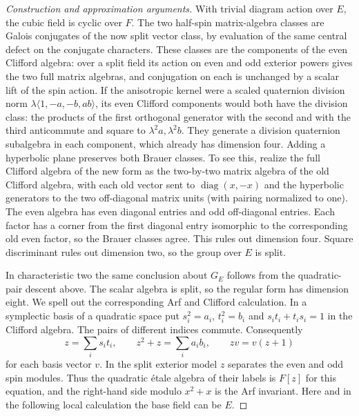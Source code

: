 \documentclass[11pt,a4paper,openany,oneside]{book}
\theoremstyle{resultstyle}
\theoremstyle{definition}
\numberwithin{equation}{chapter}
\begin{document}
\begin{proof}[Construction and approximation arguments]
With trivial diagram action over \(E\), the cubic
field is cyclic over \(F\). The two half-spin
matrix-algebra classes are Galois conjugates of the
now split vector class, by evaluation of the same
central defect on the conjugate characters. These
classes are the components of the even Clifford
algebra: over a split field its action on even and
odd exterior powers gives the two full matrix
algebras, and conjugation on each is unchanged by a
scalar lift of the spin action. If the anisotropic
kernel were a scaled quaternion division norm
\(\lambda\langle1,-a,-b,ab\rangle\), its even Clifford
components would both have the division class:
the products of the first orthogonal generator
with the second and with the third anticommute
and square to \(\lambda^2a,\lambda^2b\).
They generate a division quaternion subalgebra
in each component, which already has dimension four.
Adding a hyperbolic plane preserves both Brauer
classes. To see this, realize the full Clifford
algebra of the new form as the two-by-two matrix
algebra of the old Clifford algebra, with each old
vector sent to \(\operatorname{diag}(x,-x)\)
and the hyperbolic generators to the two off-diagonal
matrix units (with pairing normalized to one).
The even algebra has even diagonal entries and
odd off-diagonal entries. Each factor has a
corner from the first diagonal entry isomorphic to
the corresponding old even factor, so the Brauer
classes agree. This rules out dimension four.
Square discriminant rules out dimension two,
so the group over \(E\) is split.

In characteristic two the same conclusion about \(G_E\) follows
from the quadratic-pair descent above. The scalar algebra is split,
so the regular form has dimension eight. We spell out the
corresponding Arf and Clifford calculation. In a symplectic
basis of a quadratic space put \(s_i^2=a_i\), \(t_i^2=b_i\)
and \(s_it_i+t_is_i=1\) in the Clifford algebra. The pairs of
different indices commute. Consequently
\[
 z=\sum_i s_it_i,\qquad z^2+z=\sum_i a_i b_i,
 \qquad zv=v(z+1)
\]
for each basis vector \(v\). In the split exterior model \(z\)
separates the even and odd spin modules. Thus the quadratic
étale algebra of their labels is \(F[z]\) for this equation,
and the right-hand side modulo \(x^2+x\) is the Arf invariant.
Here and in the following local calculation the base field
can be \(E\).


\end{proof}
\end{document}
